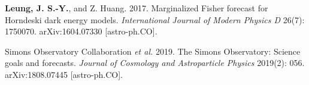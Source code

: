 



\begin{cvletter}
  
  \textbf{Leung, J. S.-Y.}, and Z. Huang. 2017. Marginalized Fisher forecast for Horndeski dark energy models. \textit{International Journal of Modern Physics D} 26(7): 1750070. arXiv:1604.07330 [astro-ph.CO].
  
\end{cvletter}

\vspace{0.2cm}




\begin{cvletter}
  
  Simons Observatory Collaboration \textit{et al.} 2019. The Simons Observatory: Science goals and forecasts. \textit{Journal of Cosmology and Astroparticle Physics} 2019(2): 056. arXiv:1808.07445 [astro-ph.CO].
  
\end{cvletter}
